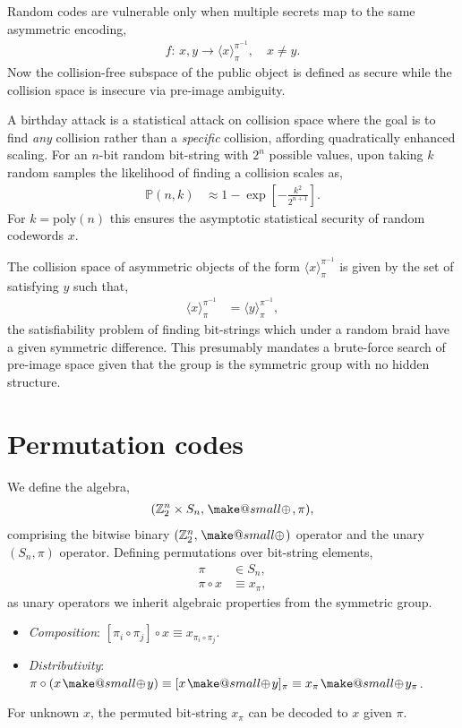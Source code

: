 \documentclass[twocolumn, aps, amsmath, amssymb, nofootinbib, superscriptaddress, longbibliography, doublefloatfix, table-of-contents, eqsecnum, rmp]{revtex4-2}
\makeatletter
\def\selfbraid#1#2#3{\langle#1\rangle_{#2}^{#3}}
\newcommand{\soplus}{{{\hspace{1pt}}{\mathbin{\mathpalette\make@small\oplus}}}{\hspace{1pt}}}
\newcommand{\make@small}[2]{%
  \vcenter{\hbox{%
    \scalebox{0.6}{$\m@th#1#2$}%
  }}%
}
\makeatother
\begin{document}
Random codes are vulnerable only when multiple secrets map to the same asymmetric encoding,
\begin{align}
	f:\, x,y \to \selfbraid{x}{\pi}{\pi^{-1}},\quad x\neq y.
\end{align}
Now the collision-free subspace of the public object is defined as secure while the collision space is insecure via pre-image ambiguity.

A birthday attack is a statistical attack on collision space where the goal is to find \emph{any} collision rather than a \emph{specific} collision, affording quadratically enhanced scaling. For an $n$-bit random bit-string with $2^n$ possible values, upon taking $k$ random samples the likelihood of finding a collision scales as,
\begin{align}
	\mathbb{P}(n,k) &\approx 1 - \exp\left[-\frac{k^2}{2^{n+1}}\right].
\end{align}
For $k=\mathrm{poly}(n)$ this ensures the asymptotic statistical security of random codewords $x$.

The collision space of asymmetric objects of the form $\selfbraid{x}{\pi}{\pi^{-1}}$ is given by the set of satisfying $y$ such that,
\begin{align}
	\selfbraid{x}{\pi}{\pi^{-1}} &= \selfbraid{y}{\pi}{\pi^{-1}},
\end{align}
the satisfiability problem of finding bit-strings which under a random braid have a given symmetric difference. This presumably mandates a brute-force search of pre-image space given that the group is the symmetric group with no hidden structure.


\section{Permutation codes}

We define the algebra,
\begin{align}
	(\mathbb{Z}_2^n \times S_n, \soplus,\pi),
\end{align}
comprising the bitwise binary $(\mathbb{Z}_2^n,\soplus)$ operator and the unary $(S_n,\pi)$ operator. Defining permutations over bit-string elements,
\begin{align}
	\pi &\in S_n,\nonumber\\
	\pi\circ x &\equiv x_\pi,
\end{align}
as unary operators we inherit algebraic properties from the symmetric group.
\begin{itemize}
	\item \emph{Composition}: $[\pi_i \circ \pi_j]\circ x \equiv x_{\pi_i\circ \pi_j}$.
	\item \emph{Distributivity}: $\pi\circ(x\soplus y) \equiv [x\soplus y]_\pi \equiv x_\pi \soplus y_\pi$.
\end{itemize}
For unknown $x$, the permuted bit-string $x_\pi$ can be decoded to $x$ given $\pi$.
\end{document}
